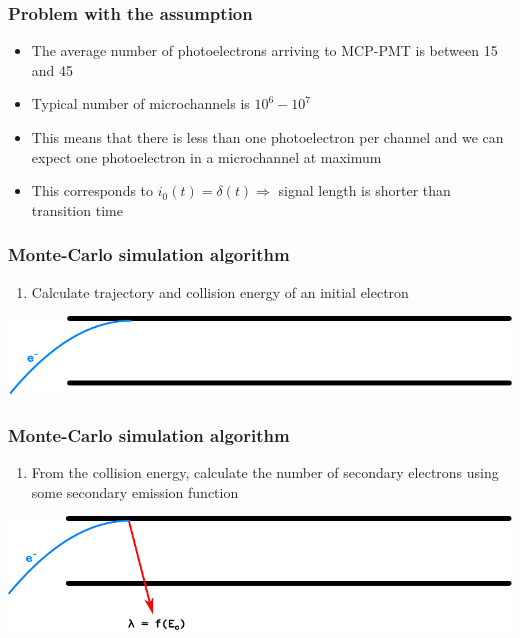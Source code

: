 \documentclass{beamer}
\begin{document}
    \begin{frame}
        \frametitle{Problem with the assumption}
        \begin{itemize}
            \item The average number of photoelectrons arriving to MCP-PMT is between 15 and 45
            \item Typical number of microchannels is $10^6 - 10^7$
            \item This means that there is less than one photoelectron per channel and we can expect
                    one photoelectron in a microchannel at maximum
            \item This corresponds to $i_0(t) = \delta(t) \Rightarrow$ signal length is shorter than
                    transition time
        \end{itemize}

    \end{frame}


    \begin{frame}
        \frametitle{Monte-Carlo simulation algorithm}

        \begin{enumerate}
            \item Calculate trajectory and collision energy of an initial electron
        \end{enumerate}

        \begin{center}
            \includegraphics[width=\linewidth]{mc1.pdf}
        \end{center}
    \end{frame}

    \begin{frame}
        \frametitle{Monte-Carlo simulation algorithm}
        \begin{enumerate}[2.]
            \item From the collision energy, calculate the number of secondary electrons using some secondary emission function
        \end{enumerate}

        \begin{center}
            \includegraphics[width=\linewidth]{mc2.pdf}
        \end{center}
    \end{frame}
\end{document}
